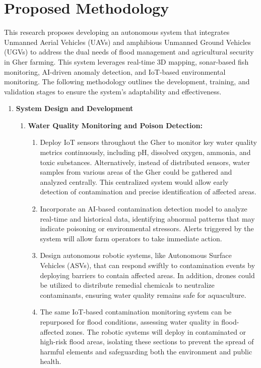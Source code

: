\documentclass[conference]{IEEEtran}
\begin{document}
\section{\textbf{Proposed Methodology}}
This research proposes developing an autonomous system that integrates Unmanned Aerial Vehicles (UAVs) and amphibious Unmanned Ground Vehicles (UGVs) to address the dual needs of flood management and agricultural security in Gher farming. This system leverages real-time 3D mapping, sonar-based fish monitoring, AI-driven anomaly detection, and IoT-based environmental monitoring. The following methodology outlines the development, training, and validation stages to ensure the system’s adaptability and effectiveness.
\begin{enumerate}
	\item\textbf{System Design and Development}
		\begin{enumerate}
			\item \textbf{Water Quality Monitoring and Poison Detection: }
				\begin{enumerate}
					\item Deploy IoT sensors throughout the Gher to monitor key water quality metrics 	    continuously, including pH, dissolved oxygen, ammonia, and toxic substances. Alternatively, instead of distributed sensors, water samples from various areas of the Gher could be gathered and analyzed centrally. This centralized system would allow early detection of contamination and precise identification of affected areas.
					\item Incorporate an AI-based contamination detection model to analyze real-time and historical data, identifying abnormal patterns that may indicate poisoning or environmental stressors. Alerts triggered by the system will allow farm operators to take immediate action.
					\item Design autonomous robotic systems, like Autonomous Surface Vehicles (ASVs), that can respond swiftly to contamination events by deploying barriers to contain affected areas. In addition, drones could be utilized to distribute remedial chemicals to neutralize contaminants, ensuring water quality remains safe for aquaculture.
					\item The same IoT-based contamination monitoring system can be repurposed for flood conditions, assessing water quality in flood-affected zones. The robotic systems will deploy in contaminated or high-risk flood areas, isolating these sections to prevent the spread of harmful elements and safeguarding both the environment and public health.

\end{enumerate}
\end{enumerate}
\end{enumerate}
\end{document}
